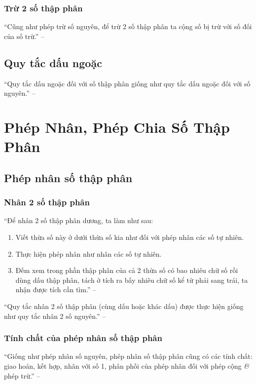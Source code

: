 \documentclass[oneside]{book}
\numberwithin{equation}{section}
\begin{document}
\subsubsection{Trừ 2 số thập phân}
``Cũng như phép trừ số nguyên, để trừ 2 số thập phân ta cộng số bị trừ với số đối của số trừ.'' -- \cite[p. 50]{Thai_Anh_Dat_Ha_Loan_Nam_Quang_Toan_6_tap_2}

\subsection{Quy tắc dấu ngoặc}
``Quy tắc dấu ngoặc đối với số thập phân giống như quy tắc dấu ngoặc đối với số nguyên.'' -- \cite[p. 50]{Thai_Anh_Dat_Ha_Loan_Nam_Quang_Toan_6_tap_2}

\section{Phép Nhân, Phép Chia Số Thập Phân}

\subsection{Phép nhân số thập phân}

\subsubsection{Nhân 2 số thập phân}
``Để nhân 2 số thập phân dương, ta làm như sau:
\begin{enumerate}
	\item Viết thừa số này ở dưới thừa số kia như đối với phép nhân các số tự nhiên.
	\item Thực hiện phép nhân như nhân các số tự nhiên.
	\item Đếm xem trong phần thập phân của cả 2 thừa số có bao nhiêu chữ số rồi dùng dấu thập phân, tách ở tích ra bấy nhiêu chữ số kể từ phải sang trái, ta nhận được tích cần tìm.'' -- \cite[p. 52]{Thai_Anh_Dat_Ha_Loan_Nam_Quang_Toan_6_tap_2}
\end{enumerate}
``Quy tắc nhân 2 số thập phân (cùng dấu hoặc khác dấu) được thực hiện giống như quy tắc nhân 2 số nguyên.'' -- \cite[p. 52]{Thai_Anh_Dat_Ha_Loan_Nam_Quang_Toan_6_tap_2}

\subsubsection{Tính chất của phép nhân số thập phân}
``Giống như phép nhân số nguyên, phép nhân số thập phân cũng có các tính chất: giao hoán, kết hợp, nhân với số 1, phân phối của phép nhân đối với phép cộng \textit{\&} phép trừ.'' -- \cite[p. 53]{Thai_Anh_Dat_Ha_Loan_Nam_Quang_Toan_6_tap_2}
\end{document}
